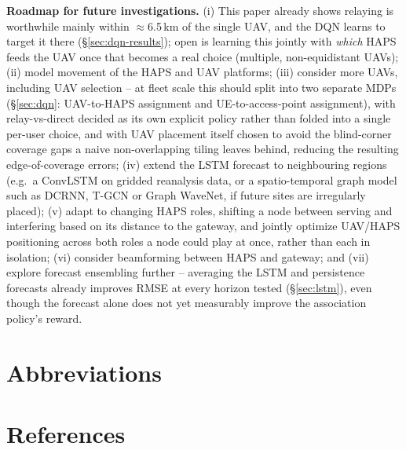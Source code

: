 \documentclass[]{ieeeaccess}
\begin{document}
\textbf{Roadmap for future investigations.} (i) This paper already shows relaying is worthwhile mainly within $\approx$6.5\,km of the single UAV, and the DQN learns to target it there (\S\ref{sec:dqn-results}); open is learning this jointly with \emph{which} HAPS feeds the UAV once that becomes a real choice (multiple, non-equidistant UAVs); (ii) model movement of the HAPS and UAV platforms; (iii) consider more UAVs, including UAV selection -- at fleet scale this should split into two separate MDPs (\S\ref{sec:dqn}: UAV-to-HAPS assignment and UE-to-access-point assignment), with relay-vs-direct decided as its own explicit policy rather than folded into a single per-user choice, and with UAV placement itself chosen to avoid the blind-corner coverage gaps a naive non-overlapping tiling leaves behind, reducing the resulting edge-of-coverage errors; (iv) extend the LSTM forecast to neighbouring regions (e.g.\ a ConvLSTM on gridded reanalysis data, or a spatio-temporal graph model such as DCRNN, T-GCN or Graph WaveNet, if future sites are irregularly placed); (v) adapt to changing HAPS roles, shifting a node between serving and interfering based on its distance to the gateway, and jointly optimize UAV/HAPS positioning across both roles a node could play at once, rather than each in isolation; (vi) consider beamforming between HAPS and gateway; and (vii) explore forecast ensembling further -- averaging the LSTM and persistence forecasts already improves RMSE at every horizon tested (\S\ref{sec:lstm}), even though the forecast alone does not yet measurably improve the association policy's reward.

\section{Abbreviations}


\section{References}


\EOD
\end{document}
